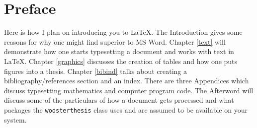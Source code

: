 \chapter*{Preface}\label{pref}

Here is how I plan on introducing you to \LaTeX. The Introduction gives some reasons for why one might find \lt superior to MS Word\texttrademark. Chapter \ref{text} will demonstrate how one starts typesetting a document and works with text in \LaTeX. Chapter \ref{graphics} discusses the creation of tables and how one puts figures into a thesis. Chapter \ref{bibind} talks about creating a bibliography/references section and an index. There are three Appendices which discuss typesetting mathematics and computer program code. The Afterword will discuss some of the particulars of how a \lt document gets processed and what packages the \texttt{woosterthesis} class uses and are assumed to be available on your system.
